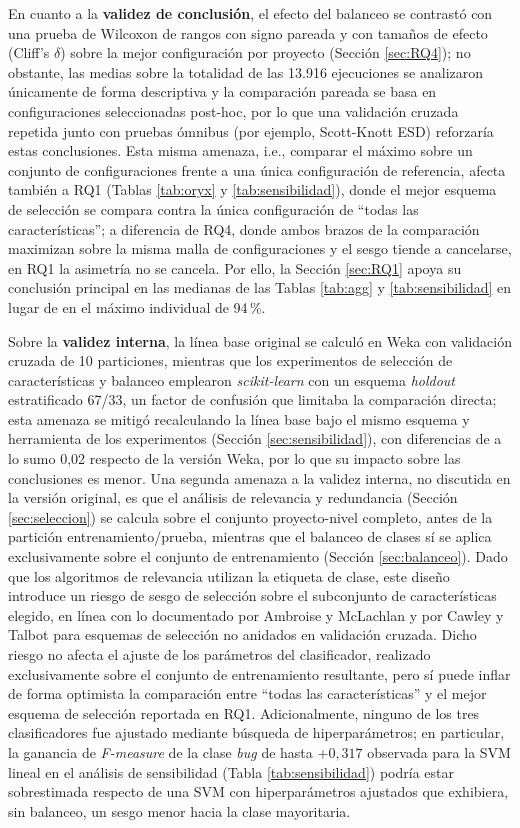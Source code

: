 \documentclass[conference,a4paper]{IEEEtran}
\begin{document}
En cuanto a la \textbf{validez de conclusión}, el efecto del balanceo se contrastó con una prueba de Wilcoxon de rangos con signo pareada y con tamaños de efecto (Cliff's $\delta$) sobre la mejor configuración por proyecto (Sección \ref{sec:RQ4}); no obstante, las medias sobre la totalidad de las 13.916 ejecuciones se analizaron únicamente de forma descriptiva y la comparación pareada se basa en configuraciones seleccionadas post-hoc, por lo que una validación cruzada repetida junto con pruebas ómnibus (por ejemplo, Scott-Knott ESD) reforzaría estas conclusiones. Esta misma amenaza, i.e., comparar el máximo sobre un conjunto de configuraciones frente a una única configuración de referencia, afecta también a RQ1 (Tablas \ref{tab:oryx} y \ref{tab:sensibilidad}), donde el mejor esquema de selección se compara contra la única configuración de ``todas las características''; a diferencia de RQ4, donde ambos brazos de la comparación maximizan sobre la misma malla de configuraciones y el sesgo tiende a cancelarse, en RQ1 la asimetría no se cancela. Por ello, la Sección \ref{sec:RQ1} apoya su conclusión principal en las medianas de las Tablas \ref{tab:agg} y \ref{tab:sensibilidad} en lugar de en el máximo individual de 94\,\%.

Sobre la \textbf{validez interna}, la línea base original se calculó en Weka con validación cruzada de 10 particiones, mientras que los experimentos de selección de características y balanceo emplearon \textit{scikit-learn} con un esquema \textit{holdout} estratificado 67/33, un factor de confusión que limitaba la comparación directa; esta amenaza se mitigó recalculando la línea base bajo el mismo esquema y herramienta de los experimentos (Sección \ref{sec:sensibilidad}), con diferencias de a lo sumo 0,02 respecto de la versión Weka, por lo que su impacto sobre las conclusiones es menor. Una segunda amenaza a la validez interna, no discutida en la versión original, es que el análisis de relevancia y redundancia (Sección \ref{sec:seleccion}) se calcula sobre el conjunto proyecto-nivel completo, antes de la partición entrenamiento/prueba, mientras que el balanceo de clases sí se aplica exclusivamente sobre el conjunto de entrenamiento (Sección \ref{sec:balanceo}). Dado que los algoritmos de relevancia utilizan la etiqueta de clase, este diseño introduce un riesgo de sesgo de selección sobre el subconjunto de características elegido, en línea con lo documentado por Ambroise y McLachlan \cite{ambroise2002} y por Cawley y Talbot \cite{cawley2010} para esquemas de selección no anidados en validación cruzada. Dicho riesgo no afecta el ajuste de los parámetros del clasificador, realizado exclusivamente sobre el conjunto de entrenamiento resultante, pero sí puede inflar de forma optimista la comparación entre ``todas las características'' y el mejor esquema de selección reportada en RQ1. Adicionalmente, ninguno de los tres clasificadores fue ajustado mediante búsqueda de hiperparámetros; en particular, la ganancia de \textit{F-measure} de la clase \textit{bug} de hasta $+0{,}317$ observada para la SVM lineal en el análisis de sensibilidad (Tabla \ref{tab:sensibilidad}) podría estar sobrestimada respecto de una SVM con hiperparámetros ajustados que exhibiera, sin balanceo, un sesgo menor hacia la clase mayoritaria.
\end{document}
